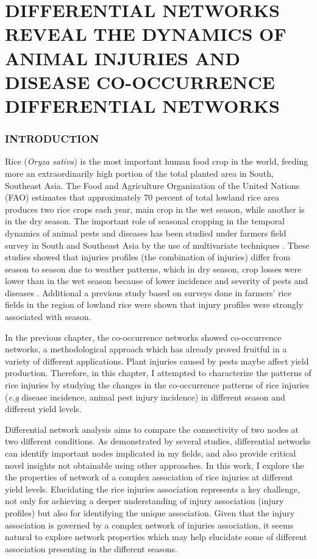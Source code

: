 \chapter{DIFFERENTIAL NETWORKS REVEAL THE DYNAMICS OF ANIMAL INJURIES AND DISEASE CO-OCCURRENCE DIFFERENTIAL NETWORKS}

\subsection{INTRODUCTION}

Rice (\textit{Oryza sativa}) is the most important human food crop in the world, feeding more an extraordinarily high portion of the total planted area in South, Southeast Asia. The Food and Agriculture Organization of the United Nations (FAO) estimates that approximately 70 percent of total lowland rice area produces two rice crops each year, main crop in the wet season, while another is in the dry season. The important role of seasonal cropping in the temporal dynamics of animal pests and diseases has been studied under farmers field survey in South and Southeast Asia by the use of multivariate techniques \citet{Savary_2000_Characterization, Willocquet_2008_Simulating}. These studies showed that injuries profiles (the combination of injuries) differ from season to season due to weather patterns, which in dry season, crop losses were lower than in the wet season because of lower incidence and severity of pests and diseases \citep{Litsinger_1991_Crop}. Additional a previous study based on surveys done in farmers’ rice fields in the region of lowland rice were shown that injury profiles were strongly associated with season.

In the previous chapter, the co-occurrence networks showed  co-occurrence networks, a methodological approach which has already proved fruitful in a variety of different applications.  Plant injuries caused by pests maybe affect yield production. Therefore, in this chapter, I attempted to characterize the patterns of rice injuries by studying the changes in the co-occurrence patterns of rice injuries (\textit{e.g} disease incidence, animal pest injury incidence) in different season and different yield levels.

Differential network analysis aims to compare the connectivity of two nodes at two different conditions. As demonstrated by several studies, differential networks can identify important nodes implicated in my fields, and also provide critical novel insights not obtainable using other approaches. In this work, I explore the the properties of network of a complex association of rice injuries at different yield levels. Elucidating the rice injuries association represents a key challenge, not only for achieving a deeper understanding of injury association (injury profiles) but also for identifying the unique association. Given that the injury association is governed by a complex network of injuries association, it seems natural to explore network properties which may help elucidate some of different association presenting in the different seasons.


